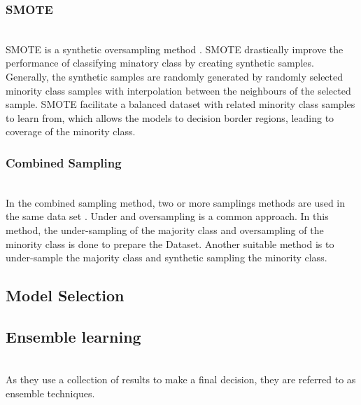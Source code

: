\subsubsection{SMOTE}\hspace*{\fill} \\
SMOTE is a synthetic oversampling method \cite{2002}. SMOTE drastically improve the performance of classifying minatory class by creating synthetic samples. Generally, the synthetic samples are randomly generated by randomly selected minority class samples with interpolation between the neighbours of the selected sample. SMOTE facilitate a balanced dataset with related minority class samples to learn from, which allows the models to decision border regions,  leading to coverage of the minority class.

\subsubsection{Combined Sampling}\hspace*{\fill} \\
In the combined sampling method, two or more samplings methods are used in the same data set \cite{10.1145/3055635.3056643}. Under and oversampling is a common approach. In this method, the under-sampling of the majority class and oversampling of the minority class is done to prepare the Dataset. Another suitable method is to under-sample the majority class and synthetic sampling the minority class. 

\subsection{Model Selection}\label{subsec:model-selection}

\subsection{Ensemble learning}\label{subsec:ensemble-learning}\hspace*{\fill} \\
As they use a collection of results to make a final decision, they are referred to as ensemble techniques.


